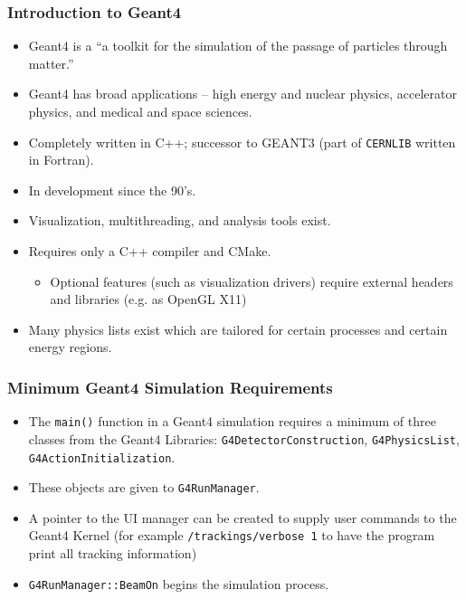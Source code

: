 \documentclass[mathserif,18pt,xcolor=table]{beamer}
\begin{document}
\begin{frame}
  \frametitle{Introduction to Geant4}
  \begin{itemize}
  \item Geant4 is a ``a toolkit for the simulation of the passage of particles through matter.''
  \item Geant4 has broad applications -- high energy and nuclear physics, accelerator physics, and medical and space sciences.
  \item Completely written in C++; successor to GEANT3 (part of \texttt{CERNLIB} written in Fortran).
  \item In development since the 90's.
  \item Visualization, multithreading, and analysis tools exist.
  \item Requires only a C++ compiler and CMake.
    \begin{itemize}
    \item Optional features (such as visualization drivers) require external headers and libraries (e.g. as OpenGL X11)
    \end{itemize}
  \item Many physics lists exist which are tailored for certain processes and certain energy regions.
  \end{itemize}
\end{frame}

\begin{frame}
  \frametitle{Minimum Geant4 Simulation Requirements}
             {\footnotesize
               \begin{itemize}
               \item The \texttt{main()} function in a Geant4 simulation requires a minimum of three classes from the Geant4 Libraries: \texttt{G4DetectorConstruction}, \texttt{G4PhysicsList}, \texttt{G4ActionInitialization}.
               \item These objects are given to \texttt{G4RunManager}.
               \item A pointer to the UI manager can be created to supply user commands to the Geant4 Kernel (for example \texttt{/trackings/verbose 1} to have the program print all tracking information)
               \item \texttt{G4RunManager::BeamOn} begins the simulation process.
             \end{itemize}}
             \lstI
\end{frame}
\end{document}
